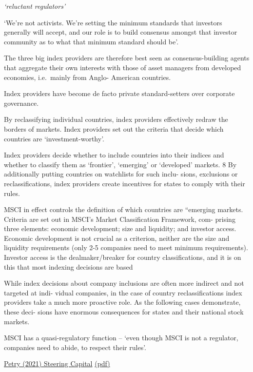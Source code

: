 \documentclass[
]{book}
\begin{document}
\emph{`reluctant regulators'}

`We're not activists. We're setting the minimum standards
that investors generally will accept, and our role is to build consensus amongst that
investor community as to what that minimum standard should be'.

The three big index providers are therefore best
seen as consensus-building agents that aggregate their own interests with those of
asset managers from developed economies, i.e.~mainly from Anglo-
American countries.

Index providers have become de facto private standard-setters over corporate governance.

By reclassifying individual countries, index providers effectively redraw the borders of
markets. Index providers set out the criteria that decide which countries are
`investment-worthy'.

Index providers decide whether to include countries
into their indices and whether to classify them as `frontier', `emerging' or
`developed' markets. 8 By additionally putting countries on watchlists for such inclu-
sions, exclusions or reclassifications, index providers create incentives for states to
comply with their rules.

MSCI in effect controls the definition of which countries
are ``emerging markets.
Criteria are set out in MSCI's Market Classification Framework, com-
prising three elements: economic development; size and liquidity; and investor
access. Economic development is not crucial as a criterion, neither are the size and
liquidity requirements (only 2-5 companies need to meet minimum requirements).
Investor access is the dealmaker/breaker for country classifications, and it is on this
that most indexing decisions are based

While index
decisions about company inclusions are often more indirect and not targeted at indi-
vidual companies, in the case of country reclassifications index providers take a much
more proactive role. As the following cases demonstrate, these deci-
sions have enormous consequences for states and their national stock markets.

MSCI has a quasi-regulatory function -- `even though MSCI is not a regulator, companies need
to abide, to respect their rules'.

\href{https://www.tandfonline.com/doi/full/10.1080/09692290.2019.1699147}{Petry (2021) Steering Capital}
\href{pdf/Petry_2021_Steering_Capital.pdf}{(pdf)}
\end{document}
